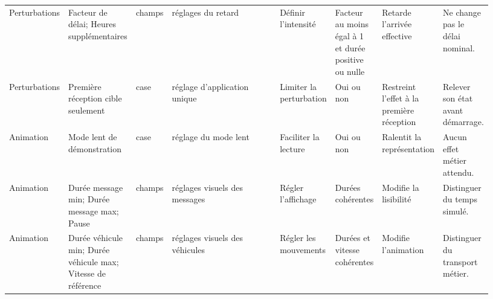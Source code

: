 \begin{landscape}
{\begin{longtable}{L{0.10\linewidth} L{0.14\linewidth} L{0.07\linewidth} L{0.24\linewidth} L{0.09\linewidth} L{0.09\linewidth} L{0.10\linewidth} L{0.10\linewidth}}
Perturbations & Facteur de délai; Heures supplémentaires & champs & réglages du retard & Définir l'intensité & Facteur au moins égal à 1 et durée positive ou nulle & Retarde l'arrivée effective & Ne change pas le délai nominal. \\
Perturbations & Première réception cible seulement & case & réglage d'application unique & Limiter la perturbation & Oui ou non & Restreint l'effet à la première réception & Relever son état avant démarrage. \\
Animation & Mode lent de démonstration & case & réglage du mode lent & Faciliter la lecture & Oui ou non & Ralentit la représentation & Aucun effet métier attendu. \\
Animation & Durée message min; Durée message max; Pause & champs & réglages visuels des messages & Régler l'affichage & Durées cohérentes & Modifie la lisibilité & Distinguer du temps simulé. \\
Animation & Durée véhicule min; Durée véhicule max; Vitesse de référence & champs & réglages visuels des véhicules & Régler les mouvements & Durées et vitesse cohérentes & Modifie l'animation & Distinguer du transport métier. \\


\end{longtable}}
\end{landscape}
